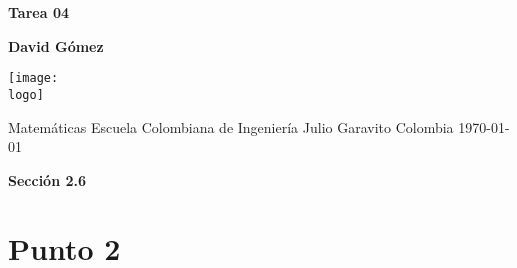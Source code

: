 \documentclass{article}
\newcommand{\logo}{C:/Users/usuario/Documents/U/logo-eci.jpg}
\newcommand{\titlename}{Tarea 04}%
\begin{document}

\begin{titlepage}
    \begin{center}
        \vspace*{1cm}

        \textbf{\Huge{\titlename}}

        \vspace{1.5cm}

        \textbf{\large{David Gómez}}

        \vspace{4cm}

        \texttt{[image: \\logo]}

        \vspace{5cm}

        Matemáticas\linebreak
        Escuela Colombiana de Ingeniería Julio Garavito\linebreak
        Colombia\linebreak
        \today

    \end{center}
\end{titlepage}
\clearpage
\begin{center}
    \textbf{Sección 2.6}
\end{center}
\tableofcontents
\clearpage

\section{Punto 2}
\end{document}
